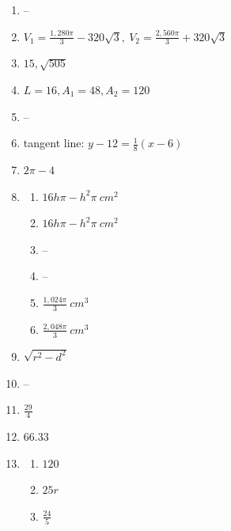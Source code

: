 \documentclass{article}
\begin{document}
\begin{enumerate}
\item --

\item $V_1 = \frac{1,280\pi}{3} - 320\sqrt{3}, \ V_2 = \frac{2,560\pi}{3} + 320\sqrt{3}$

\item $15, \sqrt{505}$

\item $ L = 16, A_1 = 48, A_2 = 120$

\item --

\item tangent line: $y - 12 = \frac{1}{8}(x-6)$

\item $2\pi - 4$

\item

	\begin{enumerate}
	
	\item $16 h \pi - h^2 \pi \ cm^2$
	
	\item $ 16 h \pi  - h^2 \pi \ cm^2$
	
	\item --
	
	\item --
	
	\item $\frac{1,024\pi}{3} \ cm^3$
	
	\item $\frac{2,048\pi}{3} \ cm^3$
	
	\end{enumerate}
	
\item $\sqrt{r^2 - d^2}$

\item --

\item $ \frac{29}{4}$

\item $66.33$

\item 

	\begin{enumerate}
	
	\item $120$
	
	\item $25r$
	
	\item $\frac{24}{5}$
	

\end{enumerate}
\end{enumerate}
\end{document}
